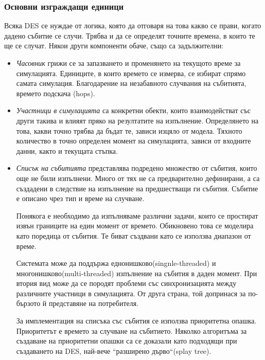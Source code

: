 		\subsubsection{Основни изграждащи единици}	
			Всяка \ac{DES} се нуждае от логика, която да отговаря на това какво се прави, когато
			дадено събитие се случи. Трябва и да се определят точните времена, в които те ще се случат.
			Някои други компоненти обаче, също са задължителни:
			
			\begin{itemize}
						
				\item \emph{Часовник} грижи се за запазването и променянето на текущото време за симулацията.
				Единиците, в които времето се измерва, се избират спрямо самата симулация.
				Благодарение на незабавното случвания на събитията, времето подскача (hops).
				
				\item \emph{Участници в симулацията} са конкретни обекти, които взаимодействат със други такива и 
				влияят пряко на резултатите на изпълнение. Определянето на това, какви точно трябва да бъдат те,
				зависи изцяло от модела. Тяхното количество в точно определен момент на симулацията,
				зависи от входните данни, както и текущата стъпка.
				
				\item \emph{Списък на събитията} представлява подредено множество от събития, които още не били
				изпълнени. Много от тях не са предварително дефинирани, а са създадени в следствие на
				изпълнение на предшестващи ги събития. Събитие е описано чрез тип и време на случване. 
				
				Понякога е необходимо да изпълняваме различни задачи, които се простират извън границите
				на един момент от времето. Обикновено това се моделира като поредица от събития.
				Те биват създвани като се използва диапазон от време.
				
				Системата може да поддържа еднонишково(singnle-threaded) и\\
				многонишково(multi-threaded) изпълнение на събития в даден момент. 
				При втория вид може да се породят проблеми със 
				синхронизацията между различните участници в симулацията. От друга страна,
				той допринася за по-бързото й представяне на потребителя.
				
				За имплементация на списъка със събития се използва приоритетна опашка. Приоритетът е
				времето за случване на събитието. Няколко алгоритъма за създаване на приоритетни опашки
				са се доказали като подходящи при създаването на \ac{DES}\cite{Jones}, най-вече ``разширено дърво``(splay tree).
				

\end{itemize}
